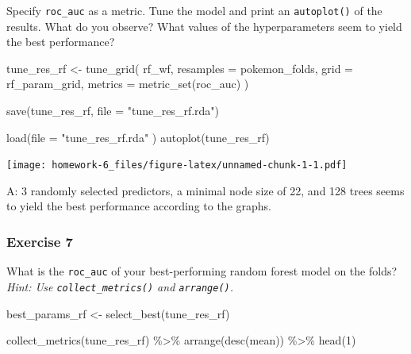 \documentclass[
]{article}
\newenvironment{Shaded}{\begin{snugshade}}{\end{snugshade}}
\newcommand{\AttributeTok}[1]{\textcolor[rgb]{0.77,0.63,0.00}{#1}}
\newcommand{\DecValTok}[1]{\textcolor[rgb]{0.00,0.00,0.81}{#1}}
\newcommand{\FunctionTok}[1]{\textcolor[rgb]{0.00,0.00,0.00}{#1}}
\newcommand{\NormalTok}[1]{#1}
\newcommand{\OtherTok}[1]{\textcolor[rgb]{0.56,0.35,0.01}{#1}}
\newcommand{\SpecialCharTok}[1]{\textcolor[rgb]{0.00,0.00,0.00}{#1}}
\newcommand{\StringTok}[1]{\textcolor[rgb]{0.31,0.60,0.02}{#1}}
\begin{document}
Specify \texttt{roc\_auc} as a metric. Tune the model and print an
\texttt{autoplot()} of the results. What do you observe? What values of
the hyperparameters seem to yield the best performance?

\begin{Shaded}
\begin{Highlighting}[]
\NormalTok{tune\_res\_rf }\OtherTok{\textless{}{-}} \FunctionTok{tune\_grid}\NormalTok{(}
\NormalTok{  rf\_wf, }
  \AttributeTok{resamples =}\NormalTok{ pokemon\_folds, }
  \AttributeTok{grid =}\NormalTok{ rf\_param\_grid, }
  \AttributeTok{metrics =} \FunctionTok{metric\_set}\NormalTok{(roc\_auc)}
\NormalTok{)}

\FunctionTok{save}\NormalTok{(tune\_res\_rf, }\AttributeTok{file =} \StringTok{"tune\_res\_rf.rda"}\NormalTok{)}
\end{Highlighting}
\end{Shaded}

\begin{Shaded}
\begin{Highlighting}[]
\FunctionTok{load}\NormalTok{(}\AttributeTok{file =} \StringTok{"tune\_res\_rf.rda"}\NormalTok{ )}
\FunctionTok{autoplot}\NormalTok{(tune\_res\_rf)}
\end{Highlighting}
\end{Shaded}

\texttt{[image: homework-6\_files/figure-latex/unnamed-chunk-1-1.pdf]}

A: 3 randomly selected predictors, a minimal node size of 22, and 128
trees seems to yield the best performance according to the graphs.

\hypertarget{exercise-7}{%
\subsubsection{Exercise 7}\label{exercise-7}}

What is the \texttt{roc\_auc} of your best-performing random forest
model on the folds? \emph{Hint: Use \texttt{collect\_metrics()} and
\texttt{arrange()}.}

\begin{Shaded}
\begin{Highlighting}[]
\NormalTok{best\_params\_rf }\OtherTok{\textless{}{-}} \FunctionTok{select\_best}\NormalTok{(tune\_res\_rf)}

\FunctionTok{collect\_metrics}\NormalTok{(tune\_res\_rf) }\SpecialCharTok{\%\textgreater{}\%} \FunctionTok{arrange}\NormalTok{(}\FunctionTok{desc}\NormalTok{(mean)) }\SpecialCharTok{\%\textgreater{}\%} \FunctionTok{head}\NormalTok{(}\DecValTok{1}\NormalTok{)}
\end{Highlighting}
\end{Shaded}
\end{document}
